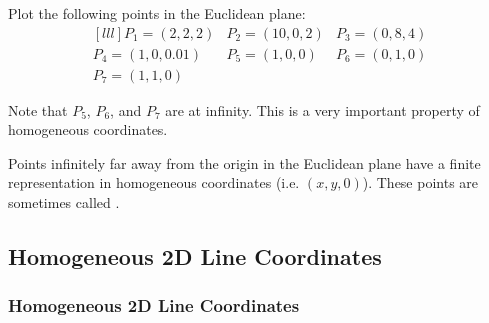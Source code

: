 \begin{example}
    Plot the following points in the Euclidean plane: \[
        \begin{matrix}[l l l]
            P_1 = (2, 2, 2) & P_2 = (10, 0, 2) & P_3 = (0, 8, 4) \\
            P_4 = (1, 0, 0.01) & P_5 = (1, 0, 0) & P_6 = (0, 1, 0) \\
            P_7 = (1, 1, 0) & &
        \end{matrix}
    \]

    \begin{center}
    \end{center}

    Note that $P_5$, $P_6$, and $P_7$ are at infinity. This is a very important property of homogeneous coordinates. 
\end{example}

\begin{remark}
    Points infinitely far away from the origin in the Euclidean plane have a finite representation in homogeneous coordinates (i.e. $(x, y, 0)$). These points are sometimes called .
\end{remark}

\subsection{Homogeneous 2D Line Coordinates}

\subsubsection{Homogeneous 2D Line Coordinates}

